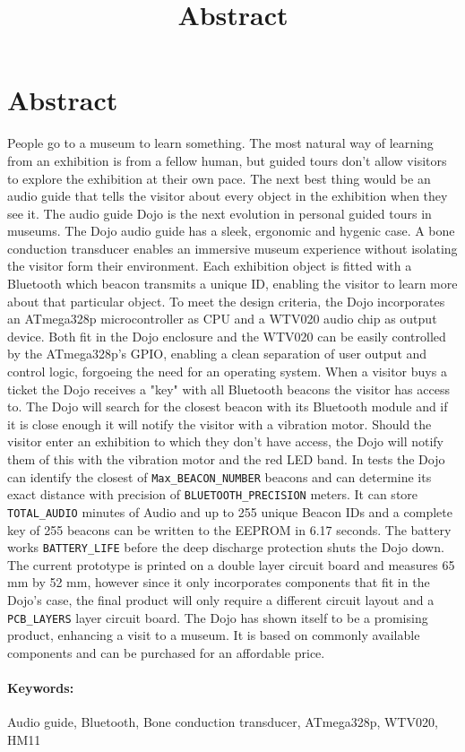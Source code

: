\documentclass[a4paper]{article}
\title{Abstract}
\begin{document}
\section*{Abstract}

People go to a museum to learn something.
The most natural way of learning from an exhibition is from a fellow human, but guided tours don't allow visitors to explore the exhibition at their own pace.
The next best thing would be an audio guide that tells the visitor about every object in the exhibition when they see it.
The audio guide Dojo is the next evolution in personal guided tours in museums.
The Dojo audio guide has a sleek, ergonomic and hygenic case.
A bone conduction transducer enables an immersive museum experience without isolating the visitor form their environment.
Each exhibition object is fitted with a Bluetooth which beacon transmits a unique ID, enabling the visitor to learn more about that particular object.
To meet the design criteria, the Dojo incorporates an ATmega328p microcontroller as CPU and a WTV020 audio chip as output device.
Both fit in the Dojo enclosure and the WTV020 can be easily controlled by the ATmega328p's GPIO, enabling a clean separation of user output and control logic, forgoeing the need for an operating system.
When a visitor buys a ticket the Dojo receives a "key" with all Bluetooth beacons the visitor has access to.
The Dojo will search for the closest beacon with its Bluetooth module and if it is close enough it will notify the visitor with a vibration motor.
Should the visitor enter an exhibition to which they don't have access, the Dojo will notify them of this with the vibration motor and the red LED band.
In tests the Dojo can identify the closest of \texttt{Max\_BEACON\_NUMBER} beacons and can determine its exact distance with precision of \texttt{BLUETOOTH\_PRECISION} meters.
It can store \texttt{TOTAL\_AUDIO} minutes of Audio and up to 255 unique Beacon IDs and a complete key of 255 beacons can be written to the EEPROM in 6.17 seconds.
The battery works \texttt{BATTERY\_LIFE} before the deep discharge protection shuts the Dojo down.
The current prototype is printed on a double layer circuit board and measures 65 mm by 52 mm, however since it only incorporates components that fit in the Dojo's case, the final product will only require a different circuit layout and a \texttt{PCB\_LAYERS} layer circuit board.
The Dojo has shown itself to be a promising product, enhancing a visit to a museum.
It is based on commonly available components and can be purchased for an affordable price.

\paragraph{Keywords:} Audio guide, Bluetooth, Bone conduction transducer, ATmega328p, WTV020, HM11
\end{document}
